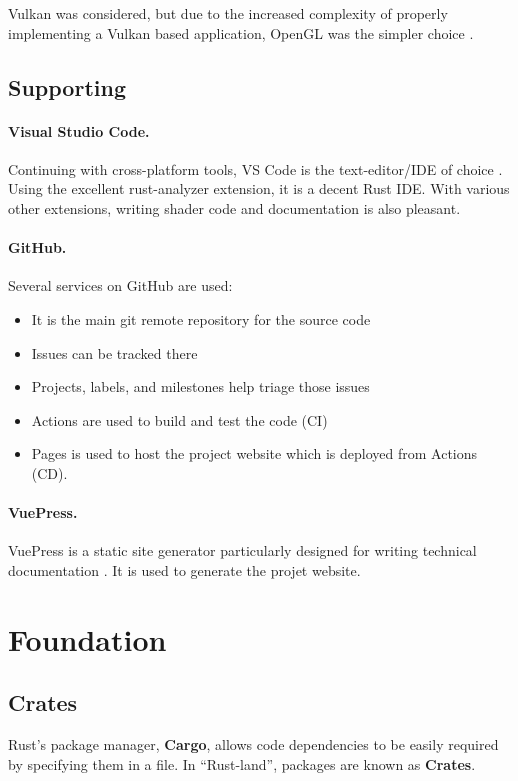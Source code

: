 \begin{multicols}{2}
  Vulkan was considered, but due to the increased complexity of properly implementing a Vulkan based application, OpenGL was the simpler choice \autocite{vulkan_vulkan_2020}.

  \subsection{Supporting}

  \paragraph{Visual Studio Code.}
  Continuing with cross-platform tools, VS Code is the text-editor/IDE of choice \autocite{visual_studio_code_visual_2020}.
  Using the excellent rust-analyzer extension, it is a decent Rust IDE\@.
  With various other extensions, writing shader code and documentation is also pleasant.

  \paragraph{GitHub.}
  Several services on GitHub are used:
  \begin{itemize}
    \item It is the main git remote repository for the source code
    \item Issues can be tracked there
    \item Projects, labels, and milestones help triage those issues
    \item Actions are used to build and test the code (CI)
    \item Pages is used to host the project website which is deployed from Actions (CD).
  \end{itemize}
  \autocite{github_github_2020}

  \paragraph{VuePress.}
  VuePress is a static site generator particularly designed for writing technical documentation \autocite{vuepress_vuepress_2020}.
  It is used to generate the projet website.

  \section{Foundation}\label{foundation}

  \subsection{Crates}
  Rust's package manager, \textbf{Cargo}, allows code dependencies to be easily required by specifying them in a  file.
  In “Rust-land”, packages are known as \textbf{Crates}.


\end{multicols}
